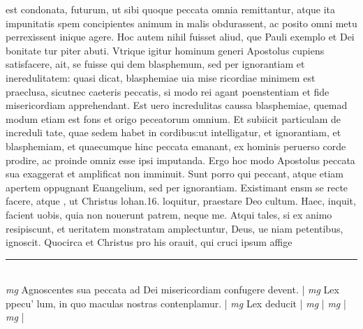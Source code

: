 \documentclass{article}
\begin{document}
\begin{pages}
est condonata, futurum, ut sibi quoque  peccata omnia remittantur, atque  ita impunitatis spem concipientes animum in malis obdurassent, ac posito omni metu perrexissent inique agere. Hoc autem nihil fuisset aliud, que  Pauli exemplo et Dei bonitate tur piter abuti. Vtrique  igitur hominum generi Apostolus cupiens satisfacere, ait, se fuisse qui dem blasphemum, sed per ignorantiam et ineredulitatem: quasi dicat, blasphemiae uia mise ricordiae minimem est praeclusa, sicutnec caeteris peccatis, si modo rei agant poenstentiam et fide misericordiam apprehendant. Est uero incredulitas caussa blasphemiae, quemad modum etiam est fons et origo peceatorum omnium. Et subiicit particulam de increduli tate, quae sedem habet in cordibus:ut intelligatur, et ignorantiam, et blasphemiam, et quaecumque  hinc peccata emanant, ex hominis peruerso corde prodire, ac proinde omniz esse ipsi imputanda. Ergo hoc modo Apostolus peccata sua exaggerat et amplificat non imminuit. Sunt porro qui peccant, atque  etiam apertem oppugnant Euangelium, sed per ignorantiam. Existimant ensm se recte facere, atque , ut Christus lohan.16. loquitur, praestare Deo cultum. Haec, inquit, facient uobis, quia non nouerunt patrem, neque  me.   Atqui tales, si ex animo resipiscunt, et ueritatem monstratam amplectuntur, Deus, ue niam petentibus, ignoscit. Quocirca et Christus pro his orauit, qui cruci ipsum affige  \pend
\vspace{0.5cm}\noindent
\vspace{0.2cm}\rule{1cm}{0.2pt}\\ 
\hspace{0.2cm}\textit{mg}
\footnotesize Agnoscentes sua peccata ad Dei misericordiam confugere devent. 
\normalsize| 
\hspace{0.2cm}\textit{mg}
\footnotesize Lex ppecu' lum, in quo maculas nostras contenplamur. 
\normalsize| 
\hspace{0.2cm}\textit{mg}
\footnotesize Lex deducit     
\normalsize| 
\hspace{0.2cm}\textit{mg}
\footnotesize            
\normalsize| 
\hspace{0.2cm}\textit{mg}
\footnotesize        
\normalsize| 
\hspace{0.2cm}\textit{mg}
\footnotesize         
\normalsize| 

\end{pages}
\end{document}
